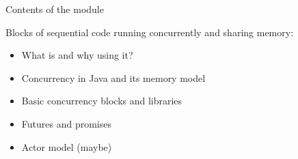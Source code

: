 \documentclass[aspectratio=169]{beamer}
\begin{document}
\begin{frame}{Contents of the module}

  \vspace*{-2mm}

  \begin{block}{Blocks of sequential code running concurrently and sharing memory:}
    
  \begin{itemize}
    \item What is  and why using it?
    \item Concurrency in Java and its memory model
    \item Basic concurrency blocks and libraries
    \item Futures and promises
    \item Actor model (maybe)
  \end{itemize}
  \end{block}


  \vspace*{2mm}

\end{frame}
\end{document}
